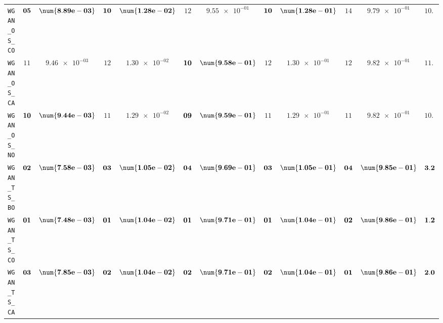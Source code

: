\begin{table}[H]
\begin{tabularx}{\textwidth}{l||cC|cC|cC|cC|cC||c}
		\texttt{WGAN\_OS\_CO} & $\bf 05$ & $\bf \num{8.89e-03}$ & $\bf 10$ & $\bf \num{1.28e-02}$ & $ 12$ & $ \num{9.55e-01}$ & $\bf 10$ & $\bf \num{1.28e-01}$ & $ 14$ & $ \num{9.79e-01}$ & $ 10.2$  \\
		\texttt{WGAN\_OS\_CA} & $ 11$ & $ \num{9.46e-03}$ & $ 12$ & $ \num{1.30e-02}$ & $\bf 10$ & $\bf \num{9.58e-01}$ & $ 12$ & $ \num{1.30e-01}$ & $ 12$ & $ \num{9.82e-01}$ & $ 11.4$  \\
		\texttt{WGAN\_OS\_NO} & $\bf 10$ & $\bf \num{9.44e-03}$ & $ 11$ & $ \num{1.29e-02}$ & $\bf 09$ & $\bf \num{9.59e-01}$ & $ 11$ & $ \num{1.29e-01}$ & $ 11$ & $ \num{9.82e-01}$ & $ 10.4$  \\
		\texttt{WGAN\_TS\_BO} & $\bf 02$ & $\bf \num{7.58e-03}$ & $\bf 03$ & $\bf \num{1.05e-02}$ & $\bf 04$ & $\bf \num{9.69e-01}$ & $\bf 03$ & $\bf \num{1.05e-01}$ & $\bf 04$ & $\bf \num{9.85e-01}$ & $\bf 3.2$  \\
		\texttt{WGAN\_TS\_CO} & $\bf 01$ & $\bf \num{7.48e-03}$ & $\bf 01$ & $\bf \num{1.04e-02}$ & $\bf 01$ & $\bf \num{9.71e-01}$ & $\bf 01$ & $\bf \num{1.04e-01}$ & $\bf 02$ & $\bf \num{9.86e-01}$ & $\bf 1.2$  \\
		\texttt{WGAN\_TS\_CA} & $\bf 03$ & $\bf \num{7.85e-03}$ & $\bf 02$ & $\bf \num{1.04e-02}$ & $\bf 02$ & $\bf \num{9.71e-01}$ & $\bf 02$ & $\bf \num{1.04e-01}$ & $\bf 01$ & $\bf \num{9.86e-01}$ & $\bf 2.0$  \\

\end{tabularx}
\end{table}
